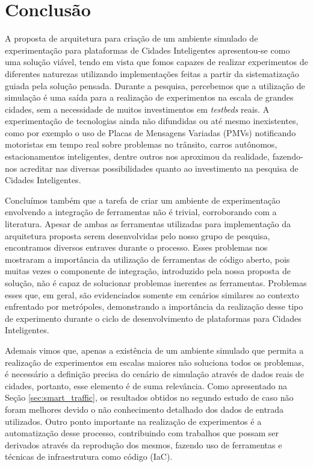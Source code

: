 \chapter{Conclusão}
\label{cap:conclusao}

%
%
%

A proposta de arquitetura para criação de um ambiente simulado de experimentação para plataformas de Cidades Inteligentes apresentou-se como uma solução viável, tendo em vista que fomos capazes de
realizar experimentos de diferentes naturezas utilizando implementações feitas a partir da sistematização guiada pela solução pensada.
Durante a pesquisa, percebemos que a utilização de simulação é uma saída para a realização de experimentos na escala de grandes cidades, sem a necessidade de muitos investimentos em \textit{testbeds} reais.
A experimentação de tecnologias ainda não difundidas ou até mesmo inexistentes, como por exemplo o uso de Placas de Mensagens Variadas (PMVs) notificando motoristas
em tempo real sobre problemas no trânsito, carros autônomos, estacionamentos inteligentes, dentre outros nos aproximou da realidade, fazendo-nos acreditar nas diversas possibilidades quanto ao
investimento na pesquisa de Cidades Inteligentes.

Concluímos também que a tarefa de criar um ambiente de experimentação envolvendo a integração de ferramentas não é trivial, corroborando com a literatura.
Apesar de ambas as ferramentas utilizadas para implementação da arquitetura proposta serem desenvolvidas pelo nosso grupo de pesquisa, encontramos diversos entraves durante o processo.
Esses problemas nos mostraram a importância da utilização de ferramentas de código aberto, pois muitas vezes o componente de integração, introduzido pela nossa proposta de solução, não é capaz de
solucionar problemas inerentes as ferramentas.
Problemas esses que, em geral, são evidenciados somente em cenários similares ao contexto enfrentado por metrópoles, demonstrando a importância da realização desse tipo de experimento durante o ciclo de
desenvolvimento de plataformas para Cidades Inteligentes.

Ademais vimos que, apenas a existência de um ambiente simulado que permita a realização de experimentos em escalas maiores não soluciona todos os problemas, é necessário a definição precisa do cenário
de simulação através de dados reais de cidades, portanto, esse elemento é de suma relevância.
Como apresentado na Seção \ref{sec:smart_traffic}, os resultados obtidos no segundo estudo de caso não foram melhores devido o não conhecimento detalhado dos dados de entrada utilizados.
Outro ponto importante na realização de experimentos é a automatização desse processo, contribuindo com trabalhos que possam ser derivados através da reprodução dos mesmos, fazendo uso de ferramentas
e técnicas de infraestrutura como código (IaC).

